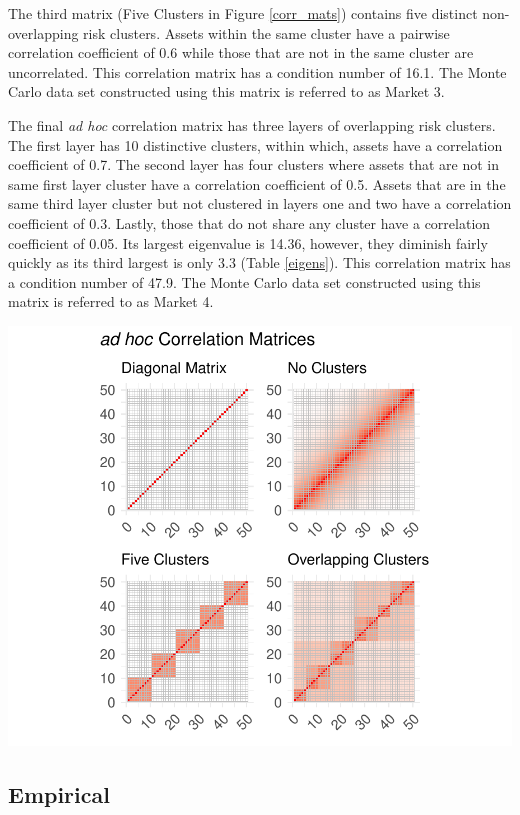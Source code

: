 \documentclass[11pt,preprint, authoryear]{elsarticle}
\let\origfigure\figure
\let\endorigfigure\endfigure
\renewenvironment{figure}[1][2] {
    \expandafter\origfigure\expandafter[H]
} {
    \endorigfigure
}
\numberwithin{equation}{section}
\numberwithin{figure}{section}
\numberwithin{table}{section}
\begin{document}
The third matrix (Five Clusters in Figure \ref{corr_mats}) contains five
distinct non-overlapping risk clusters. Assets within the same cluster
have a pairwise correlation coefficient of 0.6 while those that are not
in the same cluster are uncorrelated. This correlation matrix has a
condition number of 16.1. The Monte Carlo data set constructed using
this matrix is referred to as Market 3.

The final \emph{ad hoc} correlation matrix has three layers of
overlapping risk clusters. The first layer has 10 distinctive clusters,
within which, assets have a correlation coefficient of 0.7. The second
layer has four clusters where assets that are not in same first layer
cluster have a correlation coefficient of 0.5. Assets that are in the
same third layer cluster but not clustered in layers one and two have a
correlation coefficient of 0.3. Lastly, those that do not share any
cluster have a correlation coefficient of 0.05. Its largest eigenvalue
is 14.36, however, they diminish fairly quickly as its third largest is
only 3.3 (Table \ref{eigens}). This correlation matrix has a condition
number of 47.9. The Monte Carlo data set constructed using this matrix
is referred to as Market 4.

\begin{figure}
\centering
\includegraphics{Thesis_files/figure-latex/corr mats-1.pdf}
\caption{\label{corr_mats} Correlation Matrices}
\end{figure}

\hypertarget{empirical}{%
\subsection{\texorpdfstring{Empirical
\label{emp}}{Empirical }}\label{empirical}}
\end{document}
